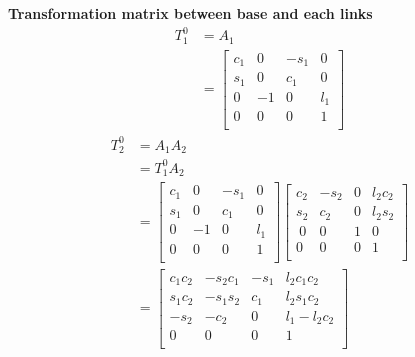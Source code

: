 \documentclass[fleqn,english,11pt,a4paper,landscape]{article}
\begin{document}
	\textbf{Transformation matrix between base and each links}
		\begin{align*}
			T^0_1 &= A_1 \\
			&= \begin{bmatrix}
		 c_{1} & 0 & -s_{1} & 0\\
		 s_{1} & 0 & c_{1} & 0\\
		 0 & -1 & 0 & l_1\\
		 0 & 0 & 0 & 1\\
		\end{bmatrix}
		\end{align*}
		\begin{align*}
			T^0_2 &= A_1A_2 \\
			&= T^0_1A_2 \\
			&= \begin{bmatrix}
		 c_{1} & 0 & -s_{1} & 0\\
		 s_{1} & 0 & c_{1} & 0\\
		 0 & -1 & 0 & l_1\\
		 0 & 0 & 0 & 1\\
		\end{bmatrix}\begin{bmatrix}
		 c_{2} & -s_{2} & 0 & l_2c_2\\
		 s_{2} & c_{2} & 0 & l_2s_2\\\
		 0 & 0 & 1 & 0\\
		 0 & 0 & 0 & 1\\
		\end{bmatrix} \\
		&= \begin{bmatrix}
			c_1c_2&-s_2c_1&-s_1&l_2c_1c_2 \\
			s_1c_2&-s_1s_2&c_1&l_2s_1c_2 \\
			-s_2&-c_2&0&l_1-l_2c_2 \\
			0&0&0&1 \\
		\end{bmatrix}
		\end{align*}
\end{document}
